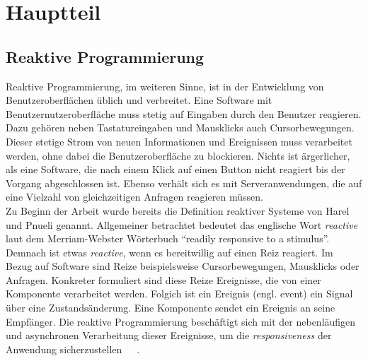 \chapter{Hauptteil}



\pagebreak



\pagebreak

\section{Reaktive Programmierung}
Reaktive Programmierung, im weiteren Sinne, ist in der Entwicklung von Benutzeroberflächen üblich und verbreitet. Eine Software mit Benutzernutzeroberfläche muss stetig auf Eingaben durch den Benutzer reagieren. Dazu gehören neben Tastatureingaben und Mausklicks auch Cursorbewegungen. Dieser stetige Strom von neuen Informationen und Ereignissen muss verarbeitet werden, ohne dabei die Benutzeroberfläche zu blockieren. Nichts ist ärgerlicher, als eine Software, die nach einem Klick auf einen Button nicht reagiert bis der Vorgang abgeschlossen ist. Ebenso verhält sich es mit Serveranwendungen, die auf eine Vielzahl von gleichzeitigen Anfragen reagieren müssen.\\
Zu Beginn der Arbeit wurde bereits die Definition reaktiver Systeme von Harel und Pnueli genannt. Allgemeiner betrachtet bedeutet das englische Wort \textit{reactive} laut dem Merriam-Webster Wörterbuch \enquote{readily responsive to a stimulus}. Demnach ist etwas \textit{reactive}, wenn es bereitwillig auf einen Reiz reagiert. Im Bezug auf Software sind Reize beispielsweise Cursorbewegungen, Mausklicks oder Anfragen. Konkreter formuliert sind diese Reize Ereignisse, die von einer Komponente verarbeitet werden. Folgich ist ein Ereignis (engl. event) ein Signal über eine Zustandsänderung. Eine Komponente sendet ein Ereignis an seine Empfänger. Die reaktive Programmierung beschäftigt sich mit der nebenläufigen und asynchronen Verarbeitung dieser Ereignisse, um die \textit{responsiveness} der Anwendung sicherzustellen~\cite{rappl_introduction_2016}~\cite[S.~4]{carkci_dataflow_2014}~\cite[S.~5]{blackheath_functional_2015}.

